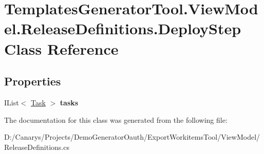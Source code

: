 \hypertarget{class_templates_generator_tool_1_1_view_model_1_1_release_definitions_1_1_deploy_step}{}\section{Templates\+Generator\+Tool.\+View\+Model.\+Release\+Definitions.\+Deploy\+Step Class Reference}
\label{class_templates_generator_tool_1_1_view_model_1_1_release_definitions_1_1_deploy_step}
\subsection*{Properties}
\begin{DoxyCompactItemize}
\item 
\mbox{\label{class_templates_generator_tool_1_1_view_model_1_1_release_definitions_1_1_deploy_step_a38782ae2dc31eb2a5cd898f03e91463e}} 
I\+List$<$ \mbox{\hyperlink{class_templates_generator_tool_1_1_view_model_1_1_release_definitions_1_1_task}{Task}} $>$ {\bfseries tasks}
\end{DoxyCompactItemize}


The documentation for this class was generated from the following file\+:\begin{DoxyCompactItemize}
\item 
D\+:/\+Canarys/\+Projects/\+Demo\+Generator\+Oauth/\+Export\+Workitems\+Tool/\+View\+Model/Release\+Definitions.\+cs\end{DoxyCompactItemize}
